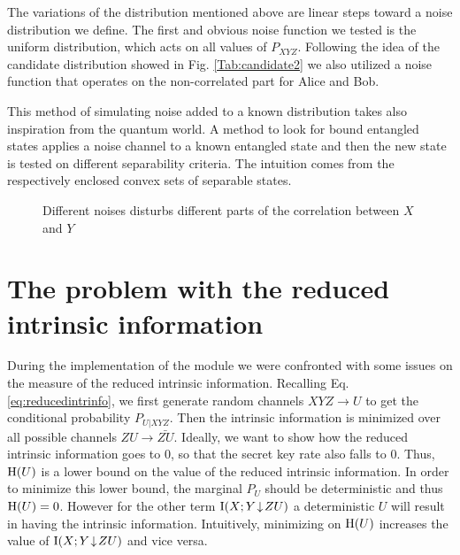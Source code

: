 	The variations of the distribution mentioned above are linear steps toward a noise distribution we define.
	The first and obvious noise function we tested is the uniform distribution, which acts on all values of $P_{XYZ}$.
	Following the idea of the candidate distribution showed in Fig. \ref{Tab:candidate2} we  also utilized a noise function that operates on the non-correlated part for Alice and Bob.
	
	This method of simulating noise added to a known distribution takes also inspiration from the quantum world. 
	A method to look for bound entangled states applies a noise channel to a known entangled state and then the new state is tested on different separability criteria.
	The intuition comes from the respectively enclosed convex sets of separable states.
	
	 
	\begin{figure}
		\begin{subfigure}{0.5\textwidth}
			
			\label{Fig:noise1}
		\end{subfigure}
		\begin{subfigure}{0.5\textwidth}
			
			\label{Fig:noise2}
		\end{subfigure}
		\caption{Different noises disturbs different parts of the correlation between $X$ and $Y$}
		\label{Fig:noises}
	\end{figure}
	
\section{The problem with the reduced intrinsic information}\label{problem}
    During the implementation of the module we were confronted with some issues on the measure of the reduced intrinsic information.
    Recalling Eq. \ref{eq:reducedintrinfo}, we first generate random channels $XYZ \rightarrow U$ to get the conditional probability $P_{U|XYZ}$. 
    Then the intrinsic information is minimized over all possible channels $ZU \rightarrow \bar{ZU}$.
    Ideally, we want to show how the reduced intrinsic information goes to $0$, so that the secret key rate also falls to $0$. 
    Thus, $\operatorname{H} (U)$ is a lower bound on the value of the reduced intrinsic information.
    In order to minimize this lower bound, the marginal $P_U$ should be deterministic and thus $\operatorname{H}(U) = 0$.
    However for the other term $\operatorname{I}(X;Y\!\downarrow\!ZU)$ a deterministic $U$ will result in having the intrinsic information.
    Intuitively, minimizing on $\operatorname{H}(U)$ increases the value of $\operatorname{I}(X;Y\!\downarrow\!ZU)$ and vice versa.
    
